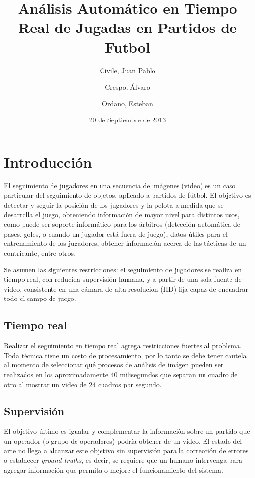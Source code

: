 \documentclass[a4paper,10pt]{article}
\title{Análisis Automático en Tiempo Real de Jugadas en Partidos de Futbol}
\date{20 de Septiembre de 2013}
\author{Civile, Juan Pablo \and Crespo, Álvaro \and Ordano, Esteban }
\begin{document}
\pagestyle{fancy}
\maketitle
\thispagestyle{fancy}

\begin{comment}
\begin{customabstract}
\textbf{
ABSTRACT
} \end{customabstract}
\end{comment}

\section{Introducción}

El seguimiento de jugadores en una secuencia de imágenes (video) es un caso
particular del seguimiento de objetos, aplicado a partidos de fútbol. El
objetivo es detectar y seguir la posición de los jugadores y la pelota a medida
que se desarrolla el juego, obteniendo información de mayor nivel para
distintos usos, como puede ser soporte informático para los árbitros
(detección automática de pases, goles, o cuando un jugador está fuera de
juego), datos útiles para el entrenamiento de los jugadores, obtener
información acerca de las tácticas de un contricante, entre otros.

Se asumen las siguientes restricciones: el seguimiento de jugadores se
realiza en tiempo real, con reducida supervisión humana, y a partir de una sola
fuente de video, consistente en una cámara de alta resolución (HD) fija capaz
de encuadrar todo el campo de juego.

\subsection{Tiempo real}

Realizar el seguimiento en tiempo real agrega restricciones fuertes al
problema. Toda técnica tiene un costo de procesamiento, por lo tanto se debe
tener cautela al momento de seleccionar qué procesos de análisis de imágen
pueden ser realizados en los aproximadamente 40 milisegundos que separan un
cuadro de otro al mostrar un video de 24 cuadros por segundo.

\subsection{Supervisión}

El objetivo último es igualar y complementar la información sobre un partido
que un operador (o grupo de operadores) podría obtener de un video. El estado
del arte no llega a alcanzar este objetivo sin supervisión para la corrección
de errores o establecer \textit{ground truths}, es decir, se requiere que un
humano intervenga para agregar información que permita o mejore el
funcionamiento del sistema.
\end{document}
